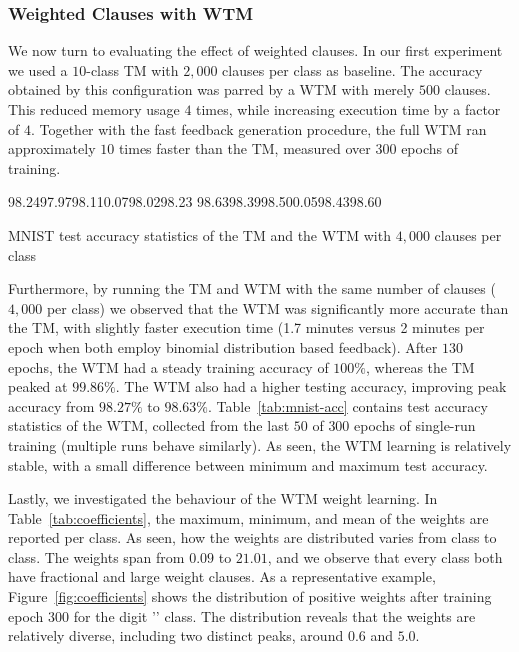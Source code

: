 \documentclass[letterpaper]{article}
\begin{document}
\subsubsection{Weighted Clauses with WTM}
We now turn to evaluating the effect of weighted clauses. In our first experiment we used a $10$-class TM with $2{,}000$ clauses per class as baseline. The accuracy obtained by this configuration was parred by a WTM with merely $500$ clauses. This reduced  memory usage $4$ times, while increasing execution time by a factor of $4$. Together with the fast feedback generation procedure, the full WTM ran
approximately $10$ times faster than the TM, measured over $300$ epochs of training.

\begin{table}[!ht]
\centering
\tableit
{98.24}{97.97}{98.11}{0.07}{98.02}{98.23}
{98.63}{98.39}{98.50}{0.05}{98.43}{98.60}
\caption{MNIST test accuracy statistics of the TM and the WTM with $4{,}000$ clauses per class}\label{tab:mnist-acc}
\end{table}

Furthermore, by running the TM and WTM with the same number of clauses ($4{,}000$ per class) we observed that the WTM was significantly more accurate than the TM, with slightly faster execution time (1.7 minutes versus 2 minutes per epoch when both employ binomial distribution based feedback). After $130$ epochs, the WTM had a steady training accuracy of $100\%$, whereas the TM peaked at $99.86\%$. The WTM also had a higher testing accuracy, improving peak accuracy from $98.27\%$ to $98.63\%$. Table~\ref{tab:mnist-acc} contains test accuracy statistics of the WTM, collected from the last $50$ of $300$ epochs of single-run training (multiple runs behave similarly). As seen, the WTM learning is relatively stable, with a small difference between minimum and maximum test accuracy.



\pgfmathsetmacro{}

Lastly, we investigated the behaviour of the WTM weight learning. In Table~\ref{tab:coefficients}, the maximum, minimum, and mean of the weights are reported per class. As seen, how the weights are distributed varies from class to class. The weights span from $0.09$ to $21.01$, and we observe that every class both have fractional and large weight clauses. As a representative example, Figure~\ref{fig:coefficients} shows the distribution of positive weights after training epoch $300$ for the digit '\class' class. The distribution reveals that the weights are relatively diverse, including two distinct peaks, around $0.6$ and $5.0$.
\end{document}
